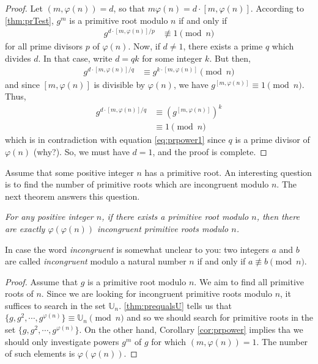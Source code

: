 \documentclass{subfile}
\begin{document}
	\begin{proof}
		Let $(m,\varphi(n))=d$, so that $m\varphi(n)=d\cdot [m,\varphi(n)]$. According to \autoref{thm:prTest}, $g^m$ is a primitive root modulo $n$ if and only if
			\begin{align}\label{eq:prpower1}
				g^{{d\cdot [m,\varphi(n)]}/{p}}
					& \not\equiv1\pmod n
			\end{align}
		for all prime divisors $p$ of $\varphi(n)$. Now, if $d \neq 1$, there exists a prime $q$ which divides $d$. In that case, write $d=qk$ for some integer $k$. But then,
			\begin{align*}
				g^{{d\cdot [m,\varphi(n)]}/{q}}
					& \equiv g^{k \cdot [m,\varphi(n)]}\pmod n
			\end{align*}
		and since $[m,\varphi(n)]$ is divisible by $\varphi(n)$, we have $g^{ [m,\varphi(n)]} \equiv 1\pmod n$. Thus,
			\begin{align*}
				g^{{d\cdot [m,\varphi(n)]}/{q}}
					& \equiv \left(g^{[m,\varphi(n)]}\right)^k\\
					& \equiv 1\pmod n
			\end{align*}
		which is in contradiction with equation \eqref{eq:prpower1} since $q$ is a prime divisor of $\varphi(n)$ (why?). So, we must have $d=1$, and the proof is complete.
	\end{proof}

Assume that some positive integer $n$ has a primitive root. An interesting question is to find the number of primitive roots which are incongruent modulo $n$. The next theorem answers this question.

	\begin{theorem}\slshape\label{thm:npr}
		For any positive integer $n$, if there exists a primitive root modulo $n$, then there are exactly $\varphi(\varphi(n))$ incongruent primitive roots modulo $n$.
	\end{theorem}

	\begin{note}
		In case the word \textit{incongruent} is somewhat unclear to you: two integers $a$ and $b$ are called \textit{incongruent} modulo a natural number $n$ if and only if $a \not \equiv b \pmod n$.
	\end{note}

	\begin{proof}
		Assume that $g$ is a primitive root modulo $n$. We aim to find all primitive roots of $n$. Since we are looking for incongruent primitive roots modulo $n$, it suffices to search in the set $\mathbb U_n$. \autoref{thm:prequalsU} tells us that $\{g,g^2,\cdots,g^{\varphi(n)}\} \equiv \mathbb U_n \pmod n$ and so we should search for primitive roots in the set $\{g,g^2,\cdots,g^{\varphi(n)}\}$. On the other hand, Corollary \ref{cor:prpower} implies tha we should only investigate powers $g^m$ of $g$ for which $(m, \varphi(n))=1$. The number of such elements is $\varphi(\varphi(n))$.
	\end{proof}
\end{document}
